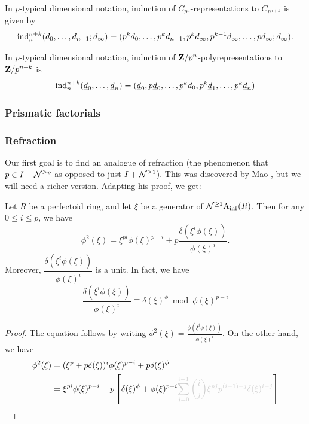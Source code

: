 \begin{corollary}
  \label{prop:ind-dim}
  In $p$-typical dimensional notation, induction of $C_{p^n}$-representations to $C_{p^{n+k}}$ is given by
  \[ \operatorname{ind}^{n+k}_n(d_0,\dotsc,d_{n-1};d_\infty) = (p^kd_0,\dotsc,p^kd_{n-1},p^kd_\infty, p^{k-1}d_\infty,\dotsc,pd_\infty;d_\infty). \]
\end{corollary}

\begin{corollary}
  \label{prop:ind-dim-poly}
  In $p$-typical dimensional notation, induction of $\mathbf Z/p^n$-polyrepresentations to $\mathbf Z/p^{n+k}$ is
  \[ \operatorname{ind}^{n+k}_{n}(\underline d_0, \dotsc, \underline d_n) = (\underline d_0, p\underline d_0, \dotsc, p^k d_0, p^k\underline d_1, \dotsc, p^k\underline d_n) \]
\end{corollary}

\subsubsection{Prismatic factorials}

\subsubsection{Refraction}

Our first goal is to find an analogue of refraction (the phenomenon that $p\in I + \mathcal N^{\ge p}$ as opposed to just $I + \mathcal N^{\ge 1}$). This was discovered by Mao \cite[Lemma 2.1]{MaoLogarithm}, but we will need a richer version. Adapting his proof, we get:

\begin{lemma}
  Let $R$ be a perfectoid ring, and let $\xi$ be a generator of $\mathcal N^{\ge 1}{ \mathrm A_{\mathrm{inf}} }(R)$. Then for any $0\le i\le p$, we have
  \[ \phi^2(\xi) = \xi^{pi} \phi(\xi)^{p-i} + p\dfrac{\delta(\xi^i \phi(\xi))}{\phi(\xi)^i}. \]
  Moreover, $\dfrac{\delta(\xi^i \phi(\xi))}{\phi(\xi)^i}$ is a unit. In fact, we have
  \[
    \dfrac{\delta(\xi^i \phi(\xi))}{\phi(\xi)^i}
    \equiv
    \delta(\xi)^\phi
    \bmod \phi(\xi)^{p-i}
  \]
\end{lemma}
\begin{proof}
  The equation follows by writing $\phi^2(\xi) = \frac{\phi(\xi^i \phi(\xi))}{\phi(\xi)^i}$. On the other hand, we have
  \begin{align*}
    \phi^2(\xi)
      &= (\xi^p + p\delta(\xi))^i \phi(\xi)^{p-i} + p\delta(\xi)^\phi\\
      &= \xi^{pi} \phi(\xi)^{p-i} + p\left[\delta(\xi)^\phi + \phi(\xi)^{p-i}\fade{\sum_{j=0}^{i-1} \binom ij \xi^{pj} p^{(i-1)-j} \delta(\xi)^{i-j}}\right]
  \end{align*}
\end{proof}
\fi

